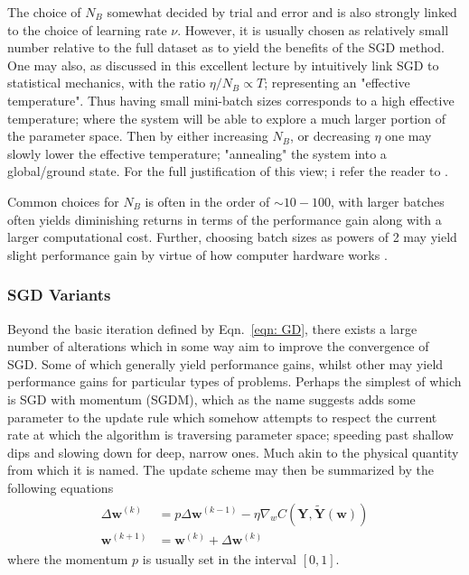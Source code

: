 \documentclass[reprint, english, nofootinbib]{revtex4-2}
\begin{document}
The choice of $N_{B}$ somewhat decided by trial and error and is also strongly linked to the choice of learning rate $\nu$. However, it is usually chosen as relatively small number relative to the full dataset as to yield the benefits of the SGD method. One may also, as discussed in this excellent lecture by \textcite{ManyBodyML} intuitively link SGD to statistical mechanics, with the ratio $\eta / N_{B} \propto T$; representing an "effective temperature". Thus having small mini-batch sizes corresponds to a high effective temperature; where the system will be able to explore a much larger portion of the parameter space. Then by either increasing $N_B$, or decreasing $\eta$ one may slowly lower the effective temperature; "annealing" the system into a global/ground state. For the full justification of this view; i refer the reader to \textcite{ManyBodyML}.

Common choices for $N_B$ is often in the order of $\sim 10-100$, with larger batches often yields diminishing returns in terms of the performance gain along with a larger computational cost. Further, choosing batch sizes as powers of 2 may yield slight performance gain by virtue of how computer hardware works \cite{Aggarwall}.

\subsubsection{SGD Variants}
\noindent
Beyond the basic iteration defined by Eqn.~\ref{eqn: GD}, there exists a large number of alterations which in some way aim to improve the convergence of SGD. Some of which generally yield performance gains, whilst other may yield performance gains for particular types of problems. Perhaps the simplest of which is SGD with momentum (SGDM), which as the name suggests adds some parameter to the update rule which somehow attempts to respect the current rate at which the algorithm is traversing parameter space; speeding past shallow dips and slowing down for deep, narrow ones. Much akin to the physical quantity from which it is named. The update scheme may then be summarized by the following equations
\begin{align}\label{eqn: SGDM}
    \begin{split}
        \Delta \pmb w^{(k)} &= p \Delta\pmb w^{(k-1)} - \eta \nabla_wC(\pmb Y, \tilde{\pmb Y}(\pmb w)) \\
        \pmb w^{(k+1)} &= \pmb w^{(k)} + \Delta\pmb w^{(k)}
    \end{split}
\end{align}
where the momentum $p$ is usually set in the interval $[0, 1]$.
\end{document}

